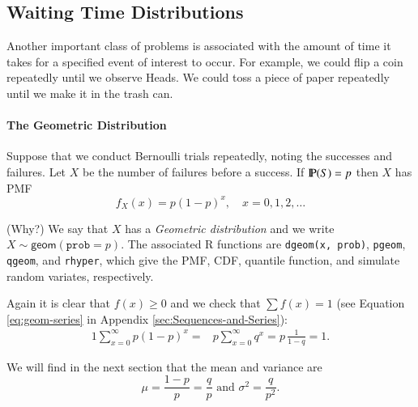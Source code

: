 \documentclass[captions=tableheading]{scrbook}
\begin{document}
\subsection{Waiting Time Distributions}
\label{sec-1-6-2}

\label{sec:Waiting-Time-Distributions}

Another important class of problems is associated with the amount of time it takes for a specified event of interest to occur. For example, we could flip a coin repeatedly until we observe Heads. We could toss a piece of paper repeatedly until we make it in the trash can.


\paragraph*{The Geometric Distribution}
\label{sub:The-Geometric-Distribution}

Suppose that we conduct Bernoulli trials repeatedly, noting the successes and failures. Let \(X\) be the number of failures before a success. If \(\P(S)=p\) then \(X\) has PMF
\begin{equation}
f_{X}(x)=p(1-p)^{x},\quad x=0,1,2,\ldots
\end{equation}

(Why?) We say that \(X\) has a \emph{Geometric distribution} and we write \(X\sim\mathsf{geom}(\mathtt{prob}=p)\). The associated \textsf{R} functions are \texttt{dgeom(x, prob)}, \texttt{pgeom}, \texttt{qgeom}, and \texttt{rhyper}, which give the PMF, CDF, quantile function, and simulate random variates, respectively.

Again it is clear that \(f(x)\geq0\) and we check that \(\sum f(x)=1\) (see Equation \ref{eq:geom-series} in Appendix \ref{sec:Sequences-and-Series}):
\begin{alignat*}{1}
\sum_{x=0}^{\infty}p(1-p)^{x}= & p\sum_{x=0}^{\infty}q^{x}=p\,\frac{1}{1-q}=1.
\end{alignat*}

We will find in the next section that the mean and variance are
\begin{equation}
\mu=\frac{1-p}{p}=\frac{q}{p}\mbox{ and }\sigma^{2}=\frac{q}{p^{2}}.
\end{equation}
\end{document}
